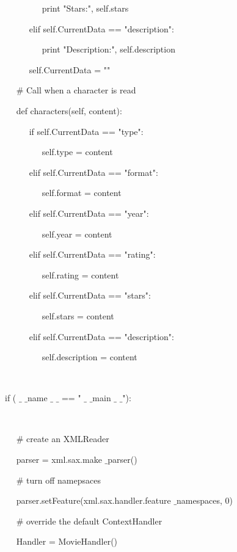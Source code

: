 ~~~~~~~~ print "Stars:", self.stars \par
\noindent 
~~~~~ elif self.CurrentData == "description": \par
\noindent 
~~~~~~~~ print "Description:", self.description \par
\noindent 
~~~~~ self.CurrentData = "" \par
\vspace{12pt}
\noindent 
~~  $  \#  $ Call when a character is read \par
\noindent 
~~ def characters(self, content): \par
\noindent 
~~~~~ if self.CurrentData == "type": \par
\noindent 
~~~~~~~~ self.type = content \par
\noindent 
~~~~~ elif self.CurrentData == "format": \par
\noindent 
~~~~~~~~ self.format = content \par
\noindent 
~~~~~ elif self.CurrentData == "year": \par
\noindent 
~~~~~~~~ self.year = content \par
\noindent 
~~~~~ elif self.CurrentData == "rating": \par
\noindent 
~~~~~~~~ self.rating = content \par
\noindent 
~~~~~ elif self.CurrentData == "stars": \par
\noindent 
~~~~~~~~ self.stars = content \par
\noindent 
~~~~~ elif self.CurrentData == "description": \par
\noindent 
~~~~~~~~ self.description = content \par
\noindent 
~  \par
\noindent 
if (  $  \_  $ $  \_  $name $  \_  $ $  \_  $ == " $  \_  $ $  \_  $main $  \_  $ $  \_  $"): \par
\noindent 
~~  \par
\noindent 
~~  $  \#  $ create an XMLReader \par
\noindent 
~~ parser = xml.sax.make $  \_  $parser() \par
\noindent 
~~  $  \#  $ turn off namepsaces \par
\noindent 
~~ parser.setFeature(xml.sax.handler.feature $  \_  $namespaces, 0) \par
\vspace{12pt}
\noindent 
~~  $  \#  $ override the default ContextHandler \par
\noindent 
~~ Handler = MovieHandler() \par
